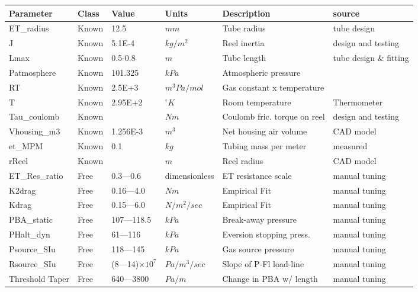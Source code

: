 \documentclass[letterpaper]{article}
\begin{document}
\begin{table}
\begin{tabular}{l|l|l|l|l|l}
Parameter     &  Class     & Value   & Units     & Description      & source \\ \hline
ET\_radius     &  Known     & 12.5    &  $mm$       & Tube radius      & tube design \\
J             &  Known     & 5.1E-4 &  $kg/m^2$    & Reel inertia     & design and testing \cite{Lewis2024XX} \\
Lmax          &  Known     & 0.5-0.8 &  $m$        & Tube length      & tube design \& fitting \\
Patmosphere   &  Known     & 101.325 &  $kPa$      & Atmospheric pressure & \\
RT            &  Known     & 2.5E+3 &   $m^3 Pa/mol$   & Gas constant x temperature &  \\
T             &  Known     & 2.95E+2 &  $^\circ K$    & Room temperature   & Thermometer \\
Tau\_coulomb   &  Known     &        &  $Nm$       & Coulomb fric. torque on reel  & design and testing \cite{Lewis2024XX} \\
Vhousing\_m3   &  Known     &  1.256E-3 &  $m^3$      & Net housing air volume  & CAD model \\
et\_MPM        &  Known     &  0.1    &  $kg$       & Tubing mass per meter  & measured \\
rReel         &  Known     &         &   $m$       & Reel radius & CAD model \\ \hline
ET\_Res\_ratio  &  Free      & 0.3---0.6 &  dimensionless &  ET resistance scale & manual tuning \\
K2drag        &  Free      & 0.16---4.0  &  $Nm$       & Empirical Fit    & manual tuning \\
Kdrag         &  Free      & 0.15---6.0   &  $N/m^2/sec$ & Empirical Fit & manual tuning \\
PBA\_static    &  Free      & 107---118.5  &  $kPa$      & Break-away pressure  & manual tuning \\
PHalt\_dyn     &  Free      & 61---116     &  $kPa$      & Eversion stopping press.  & manual tuning \\
Psource\_SIu   &  Free      & 118---145    &  $kPa$      & Gas source pressure & manual tuning\\
Rsource\_SIu   &  Free      & (8---14)$\times10^7$ &  $Pa/m^3/sec$    & Slope of P-Fl load-line & manual tuning\\
Threshold Taper & Free     &  640---3800  &  $Pa/m$      & Change in PBA w/ length   & manual tuning\\

\end{tabular}
\end{table}
\end{document}
